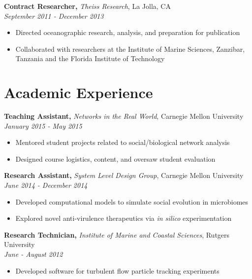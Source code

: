 \documentclass[margin]{res}
\begin{document}
\begin{resume}
{\bf Contract Researcher,} \textit{Theiss Research}, La Jolla, CA\\ \hfill
\emph{September 2011 - December 2013}
\begin{itemize} \itemsep -2pt %
\item Directed oceanographic research, analysis, and preparation for publication
\item Collaborated with researchers at the Institute of Marine Sciences, Zanzibar, \\ Tanzania and the Florida Institute of Technology
\end{itemize}


\section{Academic Experience}

{\bf Teaching Assistant,} \emph{Networks in the Real World}, Carnegie Mellon University\\ \hfill \emph{January 2015 - May 2015}
\begin{itemize} \itemsep -2pt
\item Mentored student projects related to social/biological network analysis
\item Designed course logistics, content, and oversaw student evaluation
\end{itemize}
\vspace{-10pt}
{\bf Research Assistant,} \textit{System Level Design Group}, Carnegie Mellon University\\ \hfill \emph{June 2014 - December 2014}
\begin{itemize} \itemsep -2pt
\item Developed computational models to simulate social evolution in microbiomes
\item Explored novel anti-virulence therapeutics via \emph{in silico} experimentation
\end{itemize}
\vspace{-10pt}


{\bf Research Technician,} \textit{Institute of Marine and Coastal Sciences}, Rutgers University\\ \hfill  \emph{June - August 2012}
\begin{itemize} \itemsep -2pt %
\item Developed software for turbulent flow particle tracking experiments
\end{itemize}
\vspace{-10pt}



\end{resume}
\end{document}

